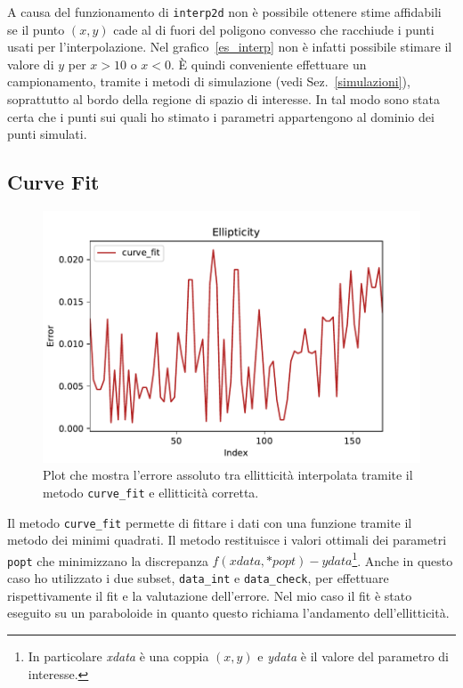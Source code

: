 \documentclass[12pt,a4paper,final]{book}
\begin{document}
A causa del funzionamento di \texttt{interp2d} non è possibile ottenere stime affidabili se il punto $(x, y)$ cade al di fuori del poligono convesso che racchiude i punti usati per l'interpolazione. Nel grafico~\ref{es_interp} non è infatti possibile stimare il valore di $y$ per $x>10$ o $x<0$.
\`E quindi conveniente effettuare un campionamento, tramite i metodi di simulazione (vedi Sez.~\ref{simulazioni}), soprattutto al bordo della regione di spazio di interesse. In tal modo sono stata certa che i punti sui quali ho stimato i parametri appartengono al dominio dei punti simulati.


\subsection{Curve Fit}\label{curve_fit}
\begin{figure}[!ht]
	\centering
	\includegraphics[scale=0.7]{../figures/error_curve_fit.pdf}
	\caption{Plot che mostra l'errore assoluto tra ellitticità interpolata tramite il metodo \texttt{curve\_fit} e ellitticità corretta.}
	\label{err_curve_fit}
\end{figure}
Il metodo \texttt{curve\_fit} permette di fittare i dati con una funzione tramite il metodo dei minimi quadrati. Il metodo restituisce i valori ottimali dei parametri \texttt{popt} che minimizzano la discrepanza $f(xdata, *popt) - ydata$\footnote{In particolare \textit{xdata} è una coppia $(x,y)$ e \textit{ydata} è il valore del parametro di interesse.}. Anche in questo caso ho utilizzato i due subset, \texttt{data\_int} e \texttt{data\_check}, per effettuare rispettivamente il fit e la valutazione dell'errore. Nel mio caso il fit è stato eseguito su un paraboloide in quanto questo richiama l'andamento dell'ellitticità.
\end{document}
